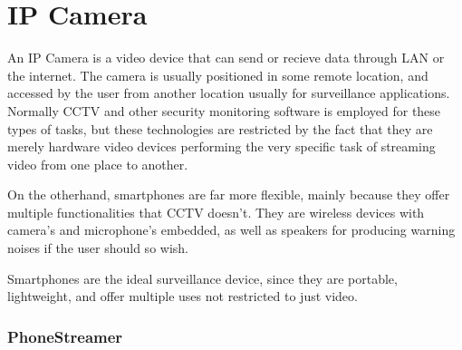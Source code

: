 %
%
%
%
%
%
%

\part{IP Camera}

An IP Camera is a video device that can send or recieve data through LAN or the internet. The camera is usually positioned in some remote location, and accessed by the user from another location usually for surveillance applications.  Normally CCTV and other security monitoring software is employed for these types of tasks, but these technologies are restricted by the fact that they are merely hardware video devices performing the very specific task of streaming video from one place to another.

On the otherhand, smartphones are far more flexible, mainly because they offer multiple functionalities that CCTV doesn't. They are wireless devices with camera's and microphone's embedded, as well as speakers for producing warning noises if the user should so wish.

Smartphones are the ideal surveillance device, since they are portable, lightweight, and offer multiple uses not restricted to just video.

\section{PhoneStreamer}

